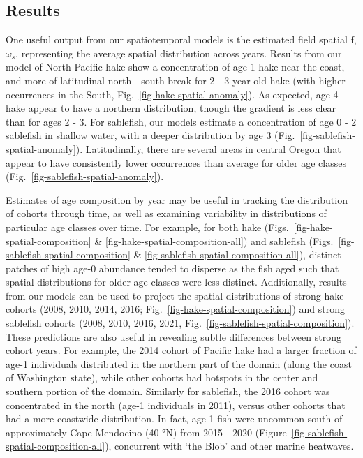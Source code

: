 \documentclass[
]{article}
\begin{document}
\hypertarget{results}{%
\subsection{Results}\label{results}}

One useful output from our spatiotemporal models is the estimated field
spatial f, \(\omega_s\), representing the average spatial distribution
across years. Results from our model of North Pacific hake show a
concentration of age-1 hake near the coast, and more of latitudinal
north - south break for 2 - 3 year old hake (with higher occurrences in
the South, Fig.~\ref{fig-hake-spatial-anomaly}). As expected, age 4 hake
appear to have a northern distribution, though the gradient is less
clear than for ages 2 - 3. For sablefish, our models estimate a
concentration of age 0 - 2 sablefish in shallow water, with a deeper
distribution by age 3 (Fig.~\ref{fig-sablefish-spatial-anomaly}).
Latitudinally, there are several areas in central Oregon that appear to
have consistently lower occurrences than average for older age classes
(Fig.~\ref{fig-sablefish-spatial-anomaly}).

Estimates of age composition by year may be useful in tracking the
distribution of cohorts through time, as well as examining variability
in distributions of particular age classes over time. For example, for
both hake (Figs.~\ref{fig-hake-spatial-composition} \&
\ref{fig-hake-spatial-composition-all}) and sablefish
(Figs.~\ref{fig-sablefish-spatial-composition} \&
\ref{fig-sablefish-spatial-composition-all}), distinct patches of high
age-0 abundance tended to disperse as the fish aged such that spatial
distributions for older age-classes were less distinct. Additionally,
results from our models can be used to project the spatial distributions
of strong hake cohorts (2008, 2010, 2014, 2016;
Fig.~\ref{fig-hake-spatial-composition}) and strong sablefish cohorts
(2008, 2010, 2016, 2021, Fig.~\ref{fig-sablefish-spatial-composition}).
These predictions are also useful in revealing subtle differences
between strong cohort years. For example, the 2014 cohort of Pacific
hake had a larger fraction of age-1 individuals distributed in the
northern part of the domain (along the coast of Washington state), while
other cohorts had hotspots in the center and southern portion of the
domain. Similarly for sablefish, the 2016 cohort was concentrated in the
north (age-1 individuals in 2011), versus other cohorts that had a more
coastwide distribution. In fact, age-1 fish were uncommon south of
approximately Cape Mendocino (40 °N) from 2015 - 2020
(Figure~\ref{fig-sablefish-spatial-composition-all}), concurrent with
`the Blob' and other marine heatwaves.
\end{document}
